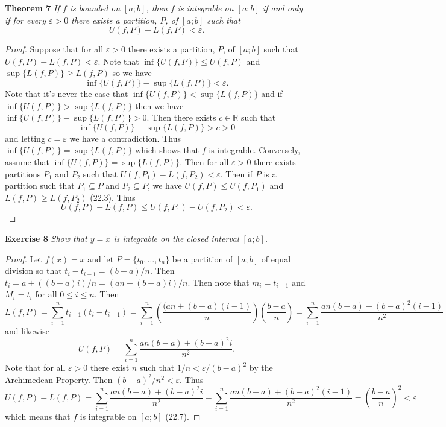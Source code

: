 \documentclass{article}
\begin{document}
\begin{flushleft}
\textbf{Theorem 7}
\textsl{If $f$ is bounded on $[a;b]$, then $f$ is integrable on $[a;b]$ if and only if for every $\varepsilon > 0$ there exists a partition, $P$, of $[a;b]$ such that
\[
U(f,P) - L(f,P) < \varepsilon.
\]}
\begin{proof}
Suppose that for all $\varepsilon > 0$ there exists a partition, $P$, of $[a;b]$ such that $U(f,P) - L(f,P) < \varepsilon$. Note that $\inf \{U(f,P)\} \leq U(f,P)$ and $\sup \{L(f,P)\} \geq L(f,P)$ so we have
\[
\inf \{U(f,P)\} - \sup \{L(f,P)\} < \varepsilon.
\]
Note that it's never the case that $\inf \{U(f,P)\} < \sup \{L(f,P)\}$ and if $\inf \{U(f,P)\} > \sup \{L(f,P)\}$ then we have $\inf \{U(f,P)\} - \sup \{L(f,P)\} > 0$. Then there exists $c \in \mathbb{R}$ such that
\[
\inf \{U(f,P)\} - \sup \{L(f,P)\} > c > 0
\]
and letting $c = \varepsilon$ we have a contradiction. Thus $\inf \{U(f,P)\} = \sup \{L(f,P)\}$ which shows that $f$ is integrable. Conversely, assume that $\inf \{U(f,P)\} = \sup \{L(f,P)\}$. Then for all $\varepsilon > 0$ there exists partitions $P_1$ and $P_2$ such that $U(f,P_1) - L(f,P_2) < \varepsilon$. Then if $P$ is a partition such that $P_1 \subseteq P$ and $P_2 \subseteq P$, we have $U(f,P) \leq U(f,P_1)$ and $L(f,P) \geq L(f,P_2)$ (22.3). Thus
\[
U(f,P) - L(f,P) \leq U(f,P_1) - U(f,P_2) < \varepsilon.
\]
\end{proof}

\textbf{Exercise 8}
\textsl{Show that $y=x$ is integrable on the closed interval $[a;b]$.}
\begin{proof}
Let $f (x) = x$ and let $P = \{t_0, \dots , t_n\}$ be a partition of $[a;b]$ of equal division so that $t_i - t_{i-1} = (b-a)/n$. Then $t_i = a + ((b-a)i)/n = (an + (b-a)i)/n$. Then note that $m_i = t_{i-1}$ and $M_i = t_i$ for all $0 \leq i \leq n$. Then
\[
L(f,P) = \sum_{i=1}^n t_{i-1} (t_i-t_{i-1}) = \sum_{i=1}^n \left ( \frac{(an + (b-a)(i-1)}{n} \right ) \left ( \frac{b-a}{n} \right ) = \sum_{i=1}^n \frac{an(b-a) + (b-a)^2 (i-1)}{n^2}
\]
and likewise
\[
U(f,P) = \sum_{i=1}^n \frac{an(b-a) + (b-a)^2 i}{n^2}.
\]
Note that for all $\varepsilon > 0$ there exist $n$ such that $1/n < \varepsilon/(b-a)^2$ by the Archimedean Property. Then $(b-a)^2/n^2 < \varepsilon$. Thus
\[
U(f,P) - L(f,P) = \sum_{i=1}^n \frac{an(b-a) + (b-a)^2 i}{n^2} - \sum_{i=1}^n \frac{an(b-a) + (b-a)^2 (i-1)}{n^2} = \left ( \frac{b-a}{n} \right )^2 < \varepsilon
\]
which means that $f$ is integrable on $[a;b]$ (22.7).
\end{proof}


\end{flushleft}
\end{document}
